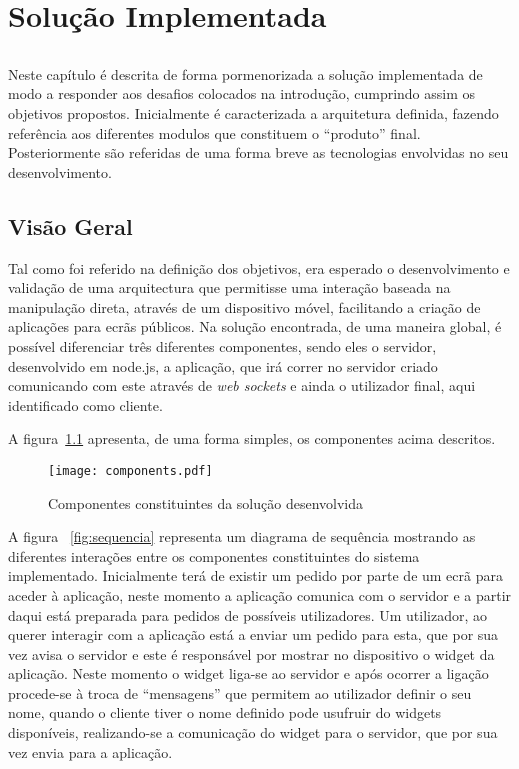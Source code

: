 \chapter{Solução Implementada} \label{chap:sol}

\section*{}

Neste capítulo é descrita de forma pormenorizada a solução implementada de modo a responder aos desafios colocados na introdução, cumprindo assim os objetivos propostos.
Inicialmente é caracterizada a arquitetura definida, fazendo referência aos diferentes modulos que constituem o “produto” final. Posteriormente são referidas de uma forma breve as tecnologias envolvidas no seu desenvolvimento.


\section{Visão Geral} \label{sec:geral}

Tal como foi referido na definição dos objetivos, era esperado o desenvolvimento e validação de uma arquitectura que permitisse uma interação baseada na manipulação direta, através de um dispositivo móvel, facilitando a criação de aplicações para ecrãs públicos.  
Na solução encontrada, de uma maneira global, é possível diferenciar três diferentes componentes, sendo eles o servidor, desenvolvido em node.js, a aplicação, que irá correr no servidor criado comunicando com este através de \textit{web sockets} e ainda o utilizador final, aqui identificado como cliente.

A figura~\ref{fig:components} apresenta, de uma forma simples, os componentes acima descritos.

\begin{figure}[ht]
\centering
\texttt{[image: components.pdf]}
\caption[\textit{Componentes}] {Componentes constituintes da solução desenvolvida}
\label{fig:components}
\end{figure}

A figura ~\ref{fig:sequencia} representa um diagrama de sequência mostrando as diferentes interações entre os componentes constituintes do sistema implementado. Inicialmente terá de existir um pedido por parte de um ecrã para aceder à aplicação, neste momento a aplicação comunica com o servidor e a partir daqui está preparada para pedidos de possíveis utilizadores. Um utilizador, ao querer interagir com a aplicação está a enviar um pedido para esta, que por sua vez avisa o servidor e este é responsável por mostrar no dispositivo o widget da aplicação. Neste momento o widget liga-se ao servidor e após ocorrer a ligação procede-se à troca de “mensagens” que permitem ao utilizador definir o seu nome, quando o cliente tiver o nome definido pode usufruir do widgets disponíveis, realizando-se a comunicação do  widget para o servidor, que por sua vez envia para a aplicação.

